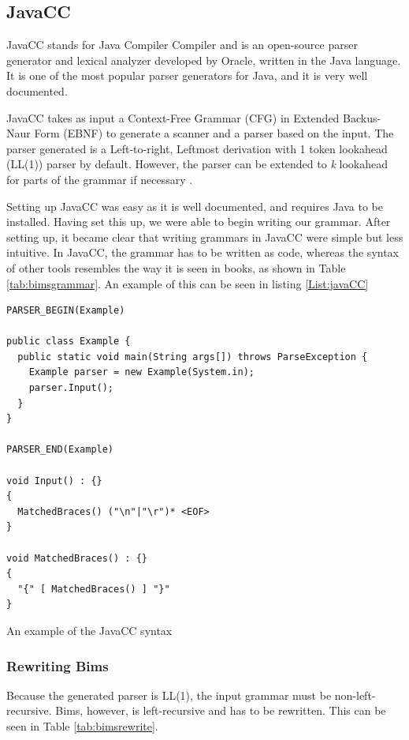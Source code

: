 \subsection{JavaCC}
JavaCC stands for Java Compiler Compiler and is an open-source parser generator and lexical analyzer developed by Oracle, written in the Java language. It is one of the most popular parser generators for Java\cite{JavaCC2021}, and it is very well documented.

JavaCC takes as input a Context-Free Grammar (CFG) in Extended Backus-Naur Form (EBNF) to generate a scanner and a parser based on the input. The parser generated is a Left-to-right, Leftmost derivation with 1 token lookahead (LL(1)) parser by default. However, the parser can be extended to \textit{k} lookahead for parts of the grammar if necessary \cite{JavaCC2021}.

Setting up JavaCC was easy as it is well documented, and requires Java to be installed. Having set this up, we were able to begin writing our grammar. After setting up, it became clear that writing grammars in JavaCC were simple but less intuitive. In JavaCC, the grammar has to be written as code, whereas the syntax of other tools resembles the way it is seen in books, as shown in Table \ref{tab:bimsgrammar}. An example of this can be seen in listing \ref{List:javaCC}

\begin{listing}[htb!]
\centering
\begin{verbatim}
PARSER_BEGIN(Example)

public class Example {
  public static void main(String args[]) throws ParseException {
    Example parser = new Example(System.in);
    parser.Input();
  }
}

PARSER_END(Example)

void Input() : {}
{
  MatchedBraces() ("\n"|"\r")* <EOF>
}

void MatchedBraces() : {}
{
  "{" [ MatchedBraces() ] "}"
}
\end{verbatim}
\caption{An example of the JavaCC syntax}
\label{List:javaCC}
\end{listing}

\subsubsection{Rewriting Bims}
Because the generated parser is LL(1), the input grammar must be non-left-recursive. Bims, however, is left-recursive and has to be rewritten. This can be seen in Table \ref{tab:bimsrewrite}.

